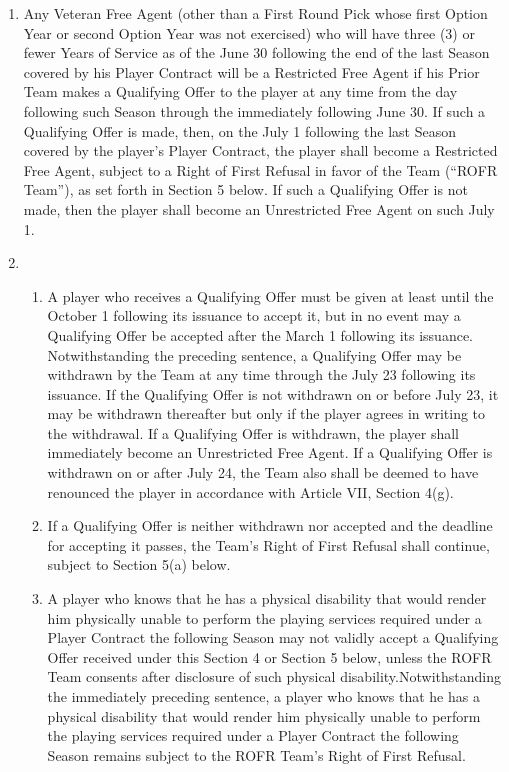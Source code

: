 \documentclass[
]{book}
\providecommand{\tightlist}{%
  \setlength{\itemsep}{0pt}\setlength{\parskip}{0pt}}
\begin{document}
\begin{enumerate}
\begin{enumerate}
    (D) The Team's offer of a Maximum Qualifying Offer must remain open for the same period that the player's Qualifying Offer remains open and cannot be withdrawn, except that if the Team withdraws its Qualifying Offer, the Maximum Qualifying Offer shall be deemed to be withdrawn simultaneously.
    (E) A player may accept either his Qualifying Offer or his Maximum Qualifying Offer, but not both.
  \end{enumerate}
\item
  Any Veteran Free Agent (other than a First Round Pick whose first Option Year or second Option Year was not exercised) who will have three (3) or fewer Years of Service as of the June 30 following the end of the last Season covered by his Player Contract will be a Restricted Free Agent if his Prior Team makes a Qualifying Offer to the player at any time from the day following such Season through the immediately following June 30. If such a Qualifying Offer is made, then, on the July 1 following the last Season covered by the player's Player Contract, the player shall become a Restricted Free Agent, subject to a Right of First Refusal in favor of the Team (``ROFR Team''), as set forth in Section 5 below. If such a Qualifying Offer is not made, then the player shall become an Unrestricted Free Agent on such July 1.
\item
  \begin{enumerate}
  \def\labelenumii{(\roman{enumii})}
  \tightlist
  \item
    A player who receives a Qualifying Offer must be given at least until the October 1 following its issuance to accept it, but in no event may a Qualifying Offer be accepted after the March 1 following its issuance. Notwithstanding the preceding sentence, a Qualifying Offer may be withdrawn by the Team at any time through the July 23 following its issuance. If the Qualifying Offer is not withdrawn on or before July 23, it may be withdrawn thereafter but only if the player agrees in writing to the withdrawal. If a Qualifying Offer is withdrawn, the player shall immediately become an Unrestricted Free Agent. If a Qualifying Offer is withdrawn on or after July 24, the Team also shall be deemed to have renounced the player in accordance with Article VII, Section 4(g).
  \item
    If a Qualifying Offer is neither withdrawn nor accepted and the deadline for accepting it passes, the Team's Right of First Refusal shall continue, subject to Section 5(a) below.
  \item
    A player who knows that he has a physical disability that would render him physically unable to perform the playing services required under a Player Contract the following Season may not validly accept a Qualifying Offer received under this Section 4 or Section 5 below, unless the ROFR Team consents after disclosure of such physical disability.Notwithstanding the immediately preceding sentence, a player who knows that he has a physical disability that would render him physically unable to perform the playing services required under a Player Contract the following Season remains subject to the ROFR Team's Right of First Refusal.

\end{enumerate}
\end{enumerate}
\end{document}
